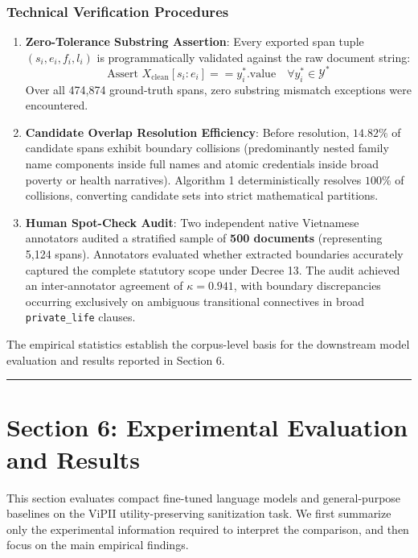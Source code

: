 \documentclass[
]{article}
\providecommand{\tightlist}{%
  \setlength{\itemsep}{0pt}\setlength{\parskip}{0pt}}
\begin{document}
\subsubsection{Technical Verification
Procedures}\label{technical-verification-procedures}

\begin{enumerate}
\def\labelenumi{\arabic{enumi}.}
\tightlist
\item
  \textbf{Zero-Tolerance Substring Assertion}: Every exported span tuple
  \((s_i, e_i, f_i, l_i)\) is programmatically validated against the raw
  document string:
  \[\text{Assert } X_{\text{clean}}[s_i : e_i] == y_i^*.\text{value} \quad \forall y_i^* \in \mathcal{Y}^*\]
  Over all 474,874 ground-truth spans, zero substring mismatch
  exceptions were encountered.
\item
  \textbf{Candidate Overlap Resolution Efficiency}: Before resolution,
  \(14.82\%\) of candidate spans exhibit boundary collisions
  (predominantly nested family name components inside full names and
  atomic credentials inside broad poverty or health narratives).
  Algorithm 1 deterministically resolves \(100\%\) of collisions,
  converting candidate sets into strict mathematical partitions.
\item
  \textbf{Human Spot-Check Audit}: Two independent native Vietnamese
  annotators audited a stratified sample of \textbf{500 documents}
  (representing 5,124 spans). Annotators evaluated whether extracted
  boundaries accurately captured the complete statutory scope under
  Decree 13. The audit achieved an inter-annotator agreement of
  \textbf{\(\kappa = 0.941\)}, with boundary discrepancies occurring
  exclusively on ambiguous transitional connectives in broad
  \texttt{private\_life} clauses.
\end{enumerate}

The empirical statistics establish the corpus-level basis for the
downstream model evaluation and results reported in Section 6.

\begin{center}\rule{0.5\linewidth}{0.5pt}\end{center}

\section{Section 6: Experimental Evaluation and
Results}\label{section-6-experimental-evaluation-and-results}

This section evaluates compact fine-tuned language models and
general-purpose baselines on the ViPII utility-preserving sanitization
task. We first summarize only the experimental information required to
interpret the comparison, and then focus on the main empirical findings.
\end{document}

